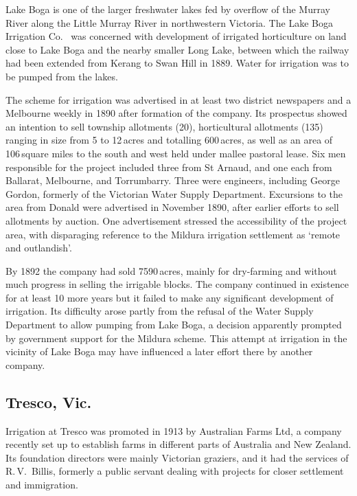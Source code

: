 Lake Boga is one of the larger freshwater lakes fed by overflow of the
Murray River along the Little Murray River 
in northwestern Victoria.  The Lake Boga Irrigation Co.\  was concerned with development of irrigated
horticulture on land close to Lake Boga and the nearby smaller Long
Lake,  between which the railway had been
extended from Kerang  to Swan Hill  in 1889.  Water for irrigation was to be pumped from the
lakes.

The scheme for irrigation was advertised in at least two district
newspapers and a Melbourne weekly in 1890 after formation of the
company.  Its prospectus showed an intention to sell township
allotments (20), horticultural allotments (135) ranging in size from 5
to 12\,acres and totalling 600\,acres, as well as an area of
106\,square miles to the south and west held under mallee pastoral
lease. Six men responsible for the project included three from St
Arnaud, and one each from Ballarat, Melbourne, and Torrumbarry.  Three
were engineers, including George Gordon, formerly of the Victorian
Water Supply Department.  Excursions to the area from Donald were
advertised in November 1890, after earlier efforts to sell allotments
by auction.  One advertisement stressed the accessibility of the
project area, with disparaging reference to the Mildura irrigation
settlement as `remote and outlandish'.

By 1892 the company had sold 7590\,acres, mainly for dry-farm\-ing and
without much progress in selling the irrigable blocks.  The company
continued in existence for at least 10 more years but it failed to
make any significant development of irrigation.  Its difficulty arose
partly from the refusal of the Water Supply Department to allow
pumping from Lake Boga, a decision apparently prompted by government
support for the Mildura scheme.  This attempt at irrigation in the
vicinity of Lake Boga may have influenced a later effort there by
another company.

\subsection*{Tresco, Vic.}

Irrigation at Tresco was promoted in 1913 by Australian Farms Ltd, a
company recently set up to establish farms in different parts of
Australia and New Zealand.  Its foundation directors were mainly
Victorian graziers, and it had the services of R.\,V.~Billis, formerly
a public servant dealing with projects for closer settlement and
immigration.

